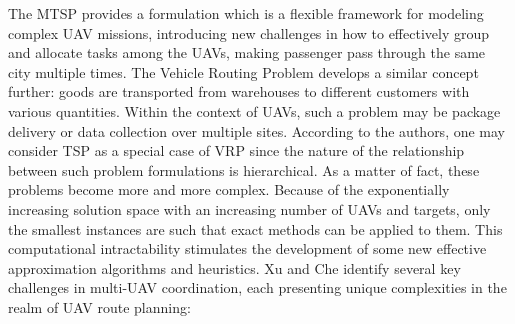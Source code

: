 \documentclass[conference]{IEEEtran}
\begin{document}
The MTSP provides a formulation which is a flexible framework for modeling complex UAV missions, introducing new challenges in how to effectively group and allocate tasks among the UAVs, making passenger pass through the same city multiple times. The Vehicle Routing Problem develops a similar concept further: goods are transported from warehouses to different customers with various quantities. Within the context of UAVs, such a problem may be package delivery or data collection over multiple sites. According to the authors, one may consider TSP as a special case of VRP since the nature of the relationship between such problem formulations is hierarchical. As a matter of fact, these problems become more and more complex. Because of the exponentially increasing solution space with an increasing number of UAVs and targets, only the smallest instances are such that exact methods can be applied to them. This computational intractability stimulates the development of some new effective approximation algorithms and heuristics. Xu and Che identify several key challenges in multi-UAV coordination, each presenting unique complexities in the realm of UAV route planning:
\end{document}
